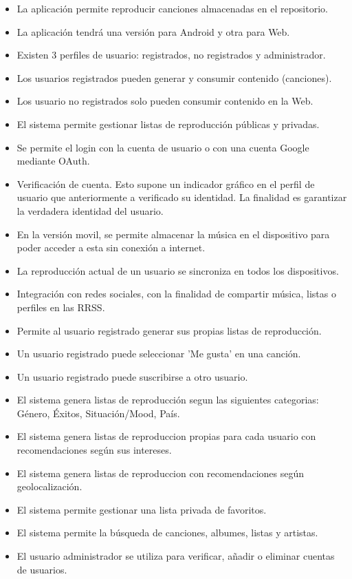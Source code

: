 \begin{itemize}
\item La aplicación permite reproducir canciones almacenadas en el repositorio.
\item La aplicación tendrá una versión para Android y otra para Web.
\item Existen 3 perfiles de usuario: registrados, no registrados y administrador.
\item Los usuarios registrados pueden generar y consumir contenido (canciones).
\item Los usuario no registrados solo pueden consumir contenido en la Web.
\item El sistema permite gestionar listas de reproducción públicas y privadas.
\item Se permite el login con la cuenta de usuario o con una cuenta Google mediante OAuth.
\item Verificación de cuenta. Esto supone un indicador gráfico en el perfil de usuario que anteriormente a verificado su identidad. La finalidad es garantizar la verdadera identidad del usuario.
\item En la versión movil, se permite almacenar la música en el dispositivo para poder acceder a esta sin conexión a internet.
\item La reproducción actual de un usuario se sincroniza en todos los dispositivos.
\item Integración con redes sociales, con la finalidad de compartir música, listas o perfiles en las RRSS.
\item Permite al usuario registrado generar sus propias listas de reproducción.

\item Un usuario registrado puede seleccionar 'Me gusta' en una canción.
\item Un usuario registrado puede suscribirse a otro usuario.
\item El sistema genera listas de reproducción segun las siguientes categorias: Género, Éxitos, Situación/Mood, País.
\item El sistema genera listas de reproduccion propias para cada usuario con recomendaciones según sus intereses.
\item El sistema genera listas de reproduccion con recomendaciones según geolocalización.
\item El sistema permite gestionar una lista privada de favoritos.
\item El sistema permite la búsqueda de canciones, albumes, listas y artistas.
\item El usuario administrador se utiliza para verificar, añadir o eliminar cuentas de usuarios.


\end{itemize}
